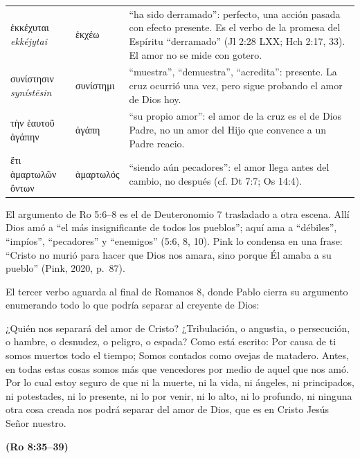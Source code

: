 \documentclass[11pt,letterpaper]{article}
\newcommand{\grc}[1]{\foreignlanguage{ancientgreek}{#1}}
\newcommand{\fuente}[1]{\par\hfill{\upshape\bfseries\small\textcolor{azul}{#1}}}
\begin{document}
\begin{filologia}[Ro 5:5, 8]
\begin{tabular}{@{}L{3.6cm}L{1.6cm}L{9.6cm}@{}}
\grc{ἐκκέχυται} \emph{ekkéjytai} & \grc{ἐκχέω} & ``ha sido derramado'': perfecto, una acción pasada con efecto presente. Es el verbo de la promesa del Espíritu ``derramado'' (Jl 2:28 LXX; Hch 2:17, 33). El amor no se mide con gotero. \\[2pt]
\grc{συνίστησιν} \emph{synístēsin} & \grc{συνίστημι} & ``muestra'', ``demuestra'', ``acredita'': presente. La cruz ocurrió una vez, pero sigue probando el amor de Dios hoy. \\[2pt]
\grc{τὴν ἑαυτοῦ ἀγάπην} & \grc{ἀγάπη} & ``su propio amor'': el amor de la cruz es el de Dios Padre, no un amor del Hijo que convence a un Padre reacio. \\[2pt]
\grc{ἔτι ἁμαρτωλῶν ὄντων} & \grc{ἁμαρτωλός} & ``siendo aún pecadores'': el amor llega antes del cambio, no después (cf. Dt 7:7; Os 14:4). \\
\end{tabular}
\end{filologia}

El argumento de Ro 5:6--8 es el de Deuteronomio 7 trasladado a otra escena. Allí Dios amó a ``el más insignificante de todos los pueblos''; aquí ama a ``débiles'', ``impíos'', ``pecadores'' y ``enemigos'' (5:6, 8, 10). Pink lo condensa en una frase: ``Cristo no murió para hacer que Dios nos amara, sino porque Él amaba a su pueblo'' (Pink, 2020, p.~87).

El tercer verbo aguarda al final de Romanos 8, donde Pablo cierra su argumento enumerando todo lo que podría separar al creyente de Dios:

\begin{cita}¿Quién nos separará del amor de Cristo? ¿Tribulación, o angustia, o persecución, o hambre, o desnudez, o peligro, o espada? Como está escrito: Por causa de ti somos muertos todo el tiempo; Somos contados como ovejas de matadero. Antes, en todas estas cosas somos más que vencedores por medio de aquel que nos amó. Por lo cual estoy seguro de que ni la muerte, ni la vida, ni ángeles, ni principados, ni potestades, ni lo presente, ni lo por venir, ni lo alto, ni lo profundo, ni ninguna otra cosa creada nos podrá separar del amor de Dios, que es en Cristo Jesús Señor nuestro.\fuente{(Ro 8:35--39)}\end{cita}
\end{document}
